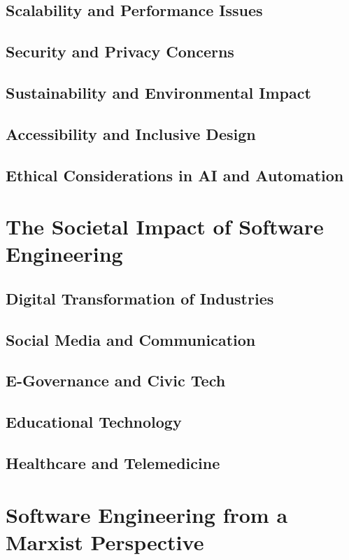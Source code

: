 \begin{refsection}
\subsection{Scalability and Performance Issues}
\subsection{Security and Privacy Concerns}
\subsection{Sustainability and Environmental Impact}
\subsection{Accessibility and Inclusive Design}
\subsection{Ethical Considerations in AI and Automation}

\newpage

\section{The Societal Impact of Software Engineering}
\subsection{Digital Transformation of Industries}
\subsection{Social Media and Communication}
\subsection{E-Governance and Civic Tech}
\subsection{Educational Technology}
\subsection{Healthcare and Telemedicine}

\newpage

\section{Software Engineering from a Marxist Perspective}

\end{refsection}
